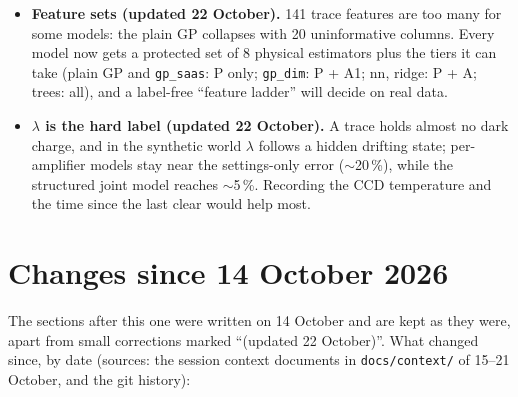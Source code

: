 \documentclass[10pt]{article}
\newcommand{\code}[1]{\texttt{#1}}
\begin{document}
\begin{basic}
\begin{itemize}
  \code{physics\_joint} (dark current + CIC) is the strongest $\lambda$ model on synthetic data (4.6\,\% at 41 packets). Every score
  has a packet-bootstrap interval, models are compared in pairs, and session C of the 43-packet plan is held out once.
\item \textbf{Feature sets (updated 22 October).} 141 trace features are too many for some models: the plain GP collapses with 20
  uninformative columns. Every model now gets a protected set of 8 physical estimators plus the tiers it can take
  (plain GP and \code{gp\_saas}: P only; \code{gp\_dim}: P + A1; nn, ridge: P + A; trees: all), and a label-free ``feature ladder''
  will decide on real data.
\item \textbf{$\lambda$ is the hard label (updated 22 October).} A trace holds almost no dark charge, and in the synthetic world $\lambda$
  follows a hidden drifting state; per-amplifier models stay near the settings-only error ($\sim$20\,\%), while the structured joint
  model reaches $\sim$5\,\%. Recording the CCD temperature and the time since the last clear would help most.
\end{itemize}
\end{basic}


\section{Changes since 14 October 2026}
\label{sec:changes}

The sections after this one were written on 14 October and are kept as they were, apart from small corrections marked
``(updated 22 October)''. What changed since, by date (sources: the session context documents in \code{docs/context/}
of 15--21 October, and the git history):
\end{document}
